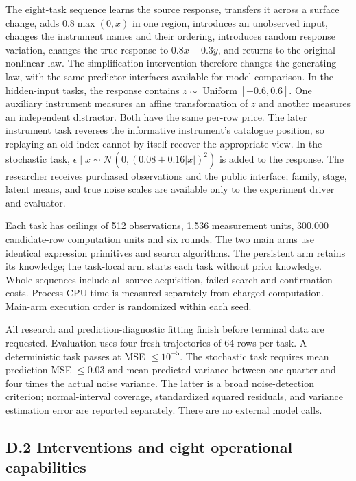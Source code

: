 \documentclass[twoside,11pt]{article}
\begin{document}
The eight-task sequence learns the source response, transfers it across a
surface change, adds \(0.8\max(0,x)\) in one region, introduces an unobserved input,
changes the instrument names and their ordering, introduces random response
variation, changes the true response to \(0.8x-0.3y\), and returns to the original
nonlinear law. The simplification intervention therefore changes the generating
law, with the same predictor interfaces available for model comparison. In the hidden-input tasks, the response contains
\(z\sim\operatorname{Uniform}[-0.6,0.6]\). One auxiliary instrument measures an
affine transformation of \(z\) and another measures an independent distractor.
Both have the same per-row price. The later instrument task reverses the
informative instrument's catalogue position, so replaying an old index cannot
by itself recover the appropriate view. In the stochastic task,
\(\epsilon\mid x\sim\mathcal N(0,(0.08+0.16|x|)^2)\) is added to the response.
The researcher receives purchased observations and the public interface; family,
stage, latent means, and true noise scales are available only to the experiment
driver and evaluator.


Each task has ceilings of 512 observations, 1,536 measurement units, 300,000
candidate-row computation units and six rounds. The two main arms use identical
expression primitives and search algorithms. The persistent arm retains its
knowledge; the task-local arm starts each task without prior knowledge. Whole
sequences include all source acquisition, failed search and confirmation costs.
Process CPU time is measured separately from charged computation. Main-arm
execution order is randomized within each seed.


All research and prediction-diagnostic fitting finish before terminal data are
requested. Evaluation uses four fresh trajectories of 64 rows per task. A
deterministic task passes at MSE \(\leq10^{-5}\). The stochastic task requires mean
prediction MSE \(\leq0.03\) and mean predicted variance between one quarter and four
times the actual noise variance. The latter is a broad noise-detection criterion;
normal-interval coverage, standardized squared residuals, and variance estimation
error are reported separately. There are no external model calls.


\subsection*{D.2 Interventions and eight operational capabilities}
\end{document}
